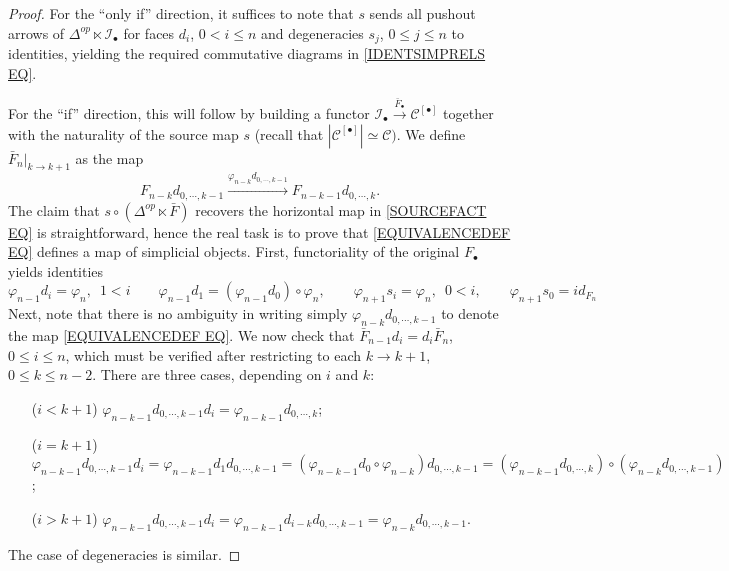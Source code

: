 \documentclass[a4paper,10pt
,draft
]{article}%
\numberwithin{equation}{section}
\numberwithin{figure}{section}
\theoremstyle{definition} %
\newcommand{\C}{\ensuremath{\mathcal C}}
\newcommand{\mcI}{\ensuremath{\mathcal{I}}}%
\newcommand{\1}{\ensuremath{\mathbbm 1}}%
\begin{document}
\begin{proof}
For the ``only if'' direction, it suffices to note that $s$ sends all pushout arrows of $\Delta^{op} \ltimes \mcI_{\bullet}$ for faces $d_i$, $0<i\leq n$ and degeneracies
$s_j$, $0\leq j \leq n$ to identities,
yielding the required commutative diagrams in \eqref{IDENTSIMPRELS EQ}.

For the ``if''  direction, this will follow by building a 
functor
$\mcI_{\bullet} \xrightarrow{\bar{F}_{\bullet}} \C^{[\bullet]}$ together with the naturality of the source map $s$ (recall that $|\C^{[\bullet]}|\simeq \C)$. We define
$\bar{F}_n|_{k \to k+1}$ as the map
\begin{equation}\label{EQUIVALENCEDEF EQ}
F_{n-k} d_{0,\cdots,k-1}
	\xrightarrow{\varphi_{n-k} d_{0,\cdots,k-1}}
F_{n-k-1} d_{0,\cdots,k}.
\end{equation}
The claim that $s \circ (\Delta^{op} \ltimes \bar{F})$ recovers the horizontal map in \eqref{SOURCEFACT EQ} is straightforward, hence the real task is to prove that \eqref{EQUIVALENCEDEF EQ} defines a map of simplicial objects.
First, functoriality of the original $F_{\bullet}$
yields identities
\[
	\varphi_{n-1}d_i = \varphi_n,\phantom{1}1<i
		\qquad
	\varphi_{n-1}d_1 = (\varphi_{n-1}d_0) \circ \varphi_n,
		\qquad
	\varphi_{n+1} s_i = \varphi_{n},\phantom{1}0<i,
		\qquad
	\varphi_{n+1} s_{0} =id_{F_{n}}
\]
Next, note that there is no ambiguity in writing simply 
$\varphi_{n-k} d_{0,\cdots,k-1}$
to denote the map \eqref{EQUIVALENCEDEF EQ}.
We now check that $\bar{F}_{n-1} d_i = d_i \bar{F}_n$, $0 \leq i \leq n$, which must be verified after restricting to each $k \to k+1$, $0\leq k \leq n-2$. There are three cases, depending on $i$ and $k$:
\begin{itemize}
	\item[($i <k+1$)] 
	$\varphi_{n-k-1} d_{0,\cdots,k-1} d_i =
	\varphi_{n-k-1} d_{0,\cdots,k}$;
	\item[($i=k+1$)] 
	$\varphi_{n-k-1} d_{0,\cdots,k-1} d_i =
	\varphi_{n-k-1} d_1 d_{0,\cdots,k-1}=
	(\varphi_{n-k-1} d_0 \circ \varphi_{n-k})d_{0,\cdots,k-1}=
	(\varphi_{n-k-1}d_{0,\cdots,k})\circ(\varphi_{n-k}d_{0,\cdots,k-1})
	$;
	\item[($i>k+1$)] 
	$\varphi_{n-k-1} d_{0,\cdots,k-1} d_i =
	\varphi_{n-k-1} d_{i-k} d_{0,\cdots,k-1} =
	\varphi_{n-k}d_{0,\cdots,k-1}$.
\end{itemize}
The case of degeneracies is similar.
\end{proof}
\end{document}
